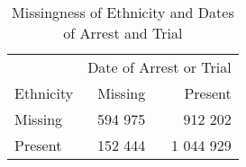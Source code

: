 \begin{table}[t]

\caption{\label{tab:missingness_of_ethnicity_and_date}Missingness of Ethnicity and Dates of Arrest and Trial}
\centering
\begin{tabular}{lrr}
\toprule
\multicolumn{1}{c}{ } & \multicolumn{2}{c}{Date of Arrest or Trial} \\
\cmidrule(l{2pt}r{2pt}){2-3}
Ethnicity & Missing & Present\\
\midrule
Missing & 594 975 & 912 202\\
Present & 152 444 & 1 044 929\\
\bottomrule
\end{tabular}
\end{table}